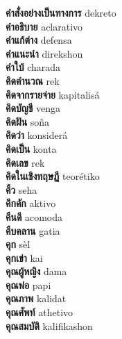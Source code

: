 \textbf{ คำสั่งอย่างเป็นทางการ  } dekreto \\
\textbf{ คำอธิบาย  } aclarativo \\
\textbf{ คำแก้ต่าง  } defensa \\
\textbf{ คำแนะนำ  } direkshon \\
\textbf{ คำใบ้  } charada \\
\textbf{ คิดคำนวณ  } rek \\
\textbf{ คิดจากรายจ่าย  } kapitalisá \\
\textbf{ คิดบัญชี  } venga \\
\textbf{ คิดฝัน  } soña \\
\textbf{ คิดว่า  } konsiderá \\
\textbf{ คิดเป็น  } konta \\
\textbf{ คิดเลข  } rek \\
\textbf{ คิดในเชิงทฤษฏี  } teorétiko \\
\textbf{ คิ้ว  } seha \\
\textbf{ คึกคัก  } aktivo \\
\textbf{ คืนดี  } acomoda \\
\textbf{ คืบคลาน  } gatia \\
\textbf{ คุก  } sèl \\
\textbf{ คุกเข่า  } kai \\
\textbf{ คุณผู้หญิง  } dama \\
\textbf{ คุณพ่อ  } papi \\
\textbf{ คุณภาพ  } kalidat \\
\textbf{ คุณศัพท์  } athetivo \\
\textbf{ คุณสมบัติ  } kalifikashon \\
